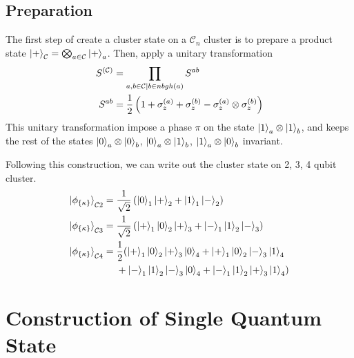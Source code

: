 \documentclass[twocolumn,secnumarabic,amssymb, nobibnotes, aps, prd]{revtex4-2}
\begin{document}
\subsection{Preparation}
The first step of create a cluster state on a $\mathcal{C}_n$ cluster is to prepare a product state $\ket{+}_{\mathcal{C}} = \bigotimes_{a \in \mathcal{C}} \ket{+}_a$. Then, apply a unitary transformation
\begin{align}
    S^{(\mathcal{C})} &= \prod_{a,b \in \mathcal{C} | b\in nbgh(a)} S^{ab}\\
    S^{ab} &= \frac{1}{2}\left(1 + \sigma_z^{(a)} + \sigma_z^{(b)} - \sigma_z^{(a)} \otimes \sigma_z^{(b)}\right)\notag
\end{align}
This unitary transformation impose a phase $\pi$ on the state $\ket{1}_a \otimes \ket{1}_b$, and keeps the rest of the states $\ket{0}_a \otimes \ket{0}_b$, $\ket{0}_a \otimes \ket{1}_b$, $\ket{1}_a \otimes \ket{0}_b$ invariant.\par

Following this construction, we can write out the cluster state on 2, 3, 4 qubit cluster.
\begin{align*}
    \ket{\phi_{\{\kappa\}}}_{\mathcal{C}2} &= \frac{1}{\sqrt{2}}\left(\ket{0}_1 \ket{+}_2 + \ket{1}_1\ket{-}_2\right)\\
    \ket{\phi_{\{\kappa\}}}_{\mathcal{C}3} &= \frac{1}{\sqrt{2}}\left(\ket{+}_1 \ket{0}_2 \ket{+}_3 + \ket{-}_1\ket{1}_2\ket{-}_3\right)\\
    \ket{\phi_{\{\kappa\}}}_{\mathcal{C}4} &= \frac{1}{2}(\ket{+}_1 \ket{0}_2 \ket{+}_3\ket{0}_4 + \ket{+}_1 \ket{0}_2 \ket{-}_3\ket{1}_4 \\
    &\ \quad + \ket{-}_1\ket{1}_2\ket{-}_3\ket{0}_4 + \ket{-}_1 \ket{1}_2 \ket{+}_3\ket{1}_4 )
\end{align*}


\section{Construction of Single Quantum State}\label{qm gates}
\end{document}
